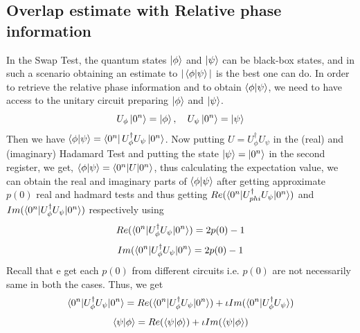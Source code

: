 \subsection{Overlap estimate with Relative phase information}
In the Swap Test, the quantum states $\ket{\phi}$ and $\ket{\psi}$ can be black-box states, and in such a scenario obtaining an estimate to $|\braket{\phi|\psi}|$ is the best one can do. In order to retrieve the relative phase information and to obtain $\braket{\phi|\psi}$, we need to have access to the unitary circuit preparing $\ket{\phi}$ and $\ket{\psi}$.
\[
U_{\phi}\ket{0^n}=\ket{\phi}, \quad U_{\psi}\ket{0^n}=\ket{\psi}
\]
Then we have $\braket{\phi|\psi}=\bra{0^n}U_{\phi}^{\dagger}U_{\psi}\ket{0^n}$. Now putting $U=U_{\phi}^{\dagger}U_{\psi}$ in the (real) and (imaginary) Hadamard Test and putting the state $\ket{\psi}=\ket{0^n}$ in the second register, we get, $\braket{\phi|\psi}=\braket{0^n|U|0^n}$, thus calculating the expectation value, we can obtain the real and imaginary parts of $\braket{\phi|\psi}$ after getting approximate $p(0)$ real and hadmard tests and thus getting $Re(\braket{0^n|U_{phi}^{\dagger}U_{\psi}|0^n})$ and $Im(\braket{0^n|U_{\phi}^{\dagger}U_{\psi}|0^n})$ respectively using
\[
Re(\braket{0^n|U_{\phi}^{\dagger}U_{\psi}|0^n})=2p(0)-1
\]
\[
Im(\braket{0^n|U_{\phi}^{\dagger}U_{\psi}|0^n}=2p(0)-1
\]
Recall that e get each $p(0)$ from different circuits i.e. $p(0)$ are not necessarily same in both the cases. Thus, we get
\[
\braket{0^n|U_{\phi}^{\dagger}U_{\psi}|0^n}=Re(\braket{0^n|U_{\phi}^{\dagger}U_{\psi}|0^n})+\iota Im(\braket{0^n|U_{\phi}^{\dagger}U_{\psi}})
\]
\[
\braket{\psi|\phi}=Re(\braket{\psi|\phi})+\iota Im(\braket{\psi|\phi})
\]

